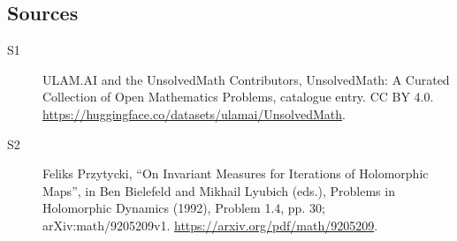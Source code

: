 \documentclass[11pt]{article}
\begin{document}
\subsection{Sources}
\begin{description}
\item[\hypertarget{source:statement:1}{S1}] ULAM.AI and the UnsolvedMath Contributors, UnsolvedMath: A Curated Collection of Open Mathematics Problems, catalogue entry. CC BY 4.0. \url{https://huggingface.co/datasets/ulamai/UnsolvedMath}.
\item[\hypertarget{source:statement:2}{S2}] Feliks Przytycki, ``On Invariant Measures for Iterations of Holomorphic Maps'', in Ben Bielefeld and Mikhail Lyubich (eds.), Problems in Holomorphic Dynamics (1992), Problem 1.4, pp. 30; arXiv:math/9205209v1. \url{https://arxiv.org/pdf/math/9205209}.
\end{description}
\label{end:statement}
\end{document}
